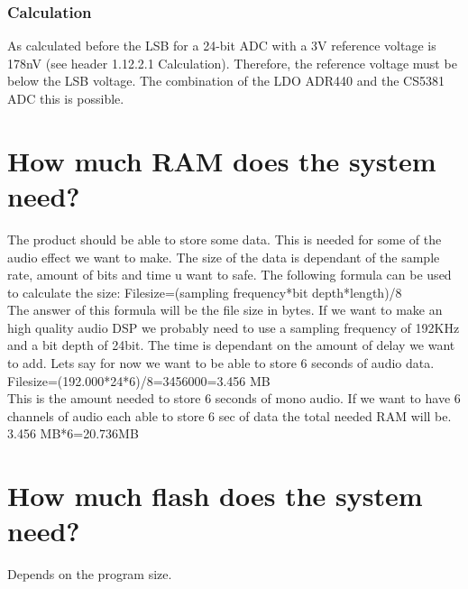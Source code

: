 \subsubsection{Calculation}
As calculated before the LSB for a 24-bit ADC with a 3V reference voltage is 178nV (see header 1.12.2.1 Calculation). Therefore, the reference voltage must be below the LSB voltage. The combination of the LDO ADR440 and the CS5381 ADC this is possible.\\

        \section{How much RAM does the system need?}
        The product should be able to store some data. This is needed for some of the audio effect we want to make. The size of the data is dependant of the sample rate, amount of bits and time u want to safe. The following formula can be used to calculate the size:
Filesize=(sampling frequency*bit depth*length)/8  \\
The answer of this formula will be the file size in bytes. If we want to make an high quality audio DSP we probably need to use a sampling frequency of 192KHz and a bit depth of 24bit. The time is dependant on the amount of delay we want to add. Lets say for now we want to be able to store 6 seconds of audio data.
Filesize=(192.000*24*6)/8=3456000=3.456 MB\\
This is the amount needed to store 6 seconds of mono audio.
If we want to have 6 channels of audio each able to store 6 sec of data the total needed RAM will be. 
3.456 MB*6=20.736MB\\

        \section{How much flash does the system need?}
        Depends on the program size.

